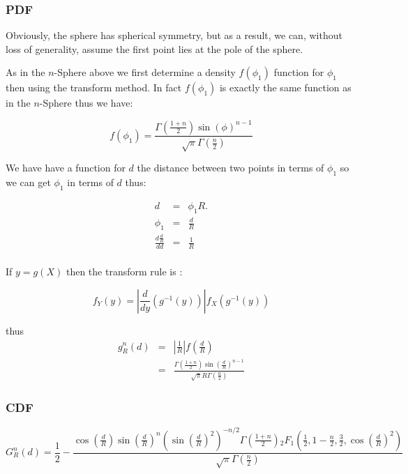\subsubsection{PDF}

Obviously, the sphere has spherical symmetry, but as a result, we can,
without loss of generality, assume the first point lies at the pole of
the sphere.

As in the $n$-Sphere above we first determine a density $f(\phi_1)$ function for $\phi_1$ then using the transform method. In fact $f(\phi_1)$ is exactly the same function as in the  $n$-Sphere thus we have:

\begin{equation}  
 f(\phi_1) = \frac{\Gamma\left(\frac{1+n}{2}\right) \sin(\phi )^{n - 1}}{\sqrt{\pi } \Gamma\left(\frac{n}{2}\right)}
\end{equation} 

We have have a function for $d$ the distance between two points in terms of $\phi_1$ so we can get  $\phi_1$ in terms of $d$ thus:

\begin{eqnarray}
  d & = & \phi_1  R.\\
\phi_1& = & \frac{d}{R}\\ 
   \frac {d \frac{d}{R}}{dd} & = & \frac{1}{R}\\
\end{eqnarray}



If $y = g(X)$ then the transform rule  is :  

\[ f_Y(y) = \left| \frac{d}{dy} \left( g^{-1}(y) \right) \right|
                f_X\left( g^{-1}(y) \right)
\]

thus 
\begin{eqnarray}
g_{R}^{n}(d) & = &  \left|\frac{1}{R}\right|  f\left(\frac{d}{R} \right)\\
            & = &   \frac{\Gamma\left(\frac{1+n}{2}\right) 
                            \sin\left(\frac{d}{R}\right)^{n-1}}
                        {\sqrt{\pi } R \Gamma\left(\frac{n}{2}\right)}
\end{eqnarray}

\subsubsection{CDF}
\begin{equation}
G_{R}^{n}(d)=\frac{1}{2}-\frac{\cos\left(\frac{d}{R}\right) \sin\left(\frac{d}{R}\right)^n \left(\sin\left(\frac{d}{R}\right)^2\right)^{-n/2}\Gamma\left(\frac{1+n}{2}\right) {}_{2}F_{1}\left(\frac{1}{2},1-\frac{n}{2},\frac{3}{2},\cos\left(\frac{d}{R}\right)^2\right) }  {\sqrt{\pi } \Gamma\left(\frac{n}{2}\right)}
\end{equation}

